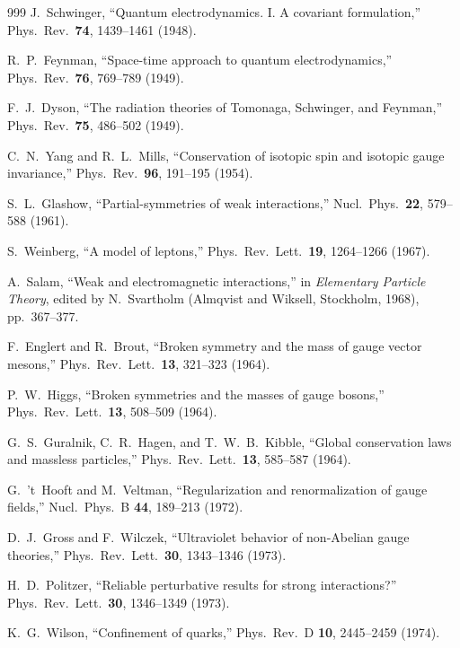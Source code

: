 \documentclass[11pt,a4paper,twoside]{book}
\theoremstyle{definition}
\begin{document}
\begin{thebibliography}{999}
J.~Schwinger,
``Quantum electrodynamics. I. A covariant formulation,''
Phys.\ Rev.\ \textbf{74}, 1439--1461 (1948).

R.~P.~Feynman,
``Space-time approach to quantum electrodynamics,''
Phys.\ Rev.\ \textbf{76}, 769--789 (1949).

F.~J.~Dyson,
``The radiation theories of Tomonaga, Schwinger, and Feynman,''
Phys.\ Rev.\ \textbf{75}, 486--502 (1949).

C.~N.~Yang and R.~L.~Mills,
``Conservation of isotopic spin and isotopic gauge invariance,''
Phys.\ Rev.\ \textbf{96}, 191--195 (1954).

S.~L.~Glashow,
``Partial-symmetries of weak interactions,''
Nucl.\ Phys.\ \textbf{22}, 579--588 (1961).

S.~Weinberg,
``A model of leptons,'' Phys.\ Rev.\ Lett.\ \textbf{19}, 1264--1266 (1967).

A.~Salam,
``Weak and electromagnetic interactions,'' in
\emph{Elementary Particle Theory}, edited by N.~Svartholm
(Almqvist and Wiksell, Stockholm, 1968), pp.~367--377.

F.~Englert and R.~Brout,
``Broken symmetry and the mass of gauge vector mesons,''
Phys.\ Rev.\ Lett.\ \textbf{13}, 321--323 (1964).

P.~W.~Higgs,
``Broken symmetries and the masses of gauge bosons,''
Phys.\ Rev.\ Lett.\ \textbf{13}, 508--509 (1964).

G.~S.~Guralnik, C.~R.~Hagen, and T.~W.~B.~Kibble,
``Global conservation laws and massless particles,''
Phys.\ Rev.\ Lett.\ \textbf{13}, 585--587 (1964).

G.~'t~Hooft and M.~Veltman,
``Regularization and renormalization of gauge fields,''
Nucl.\ Phys.\ B \textbf{44}, 189--213 (1972).

D.~J.~Gross and F.~Wilczek,
``Ultraviolet behavior of non-Abelian gauge theories,''
Phys.\ Rev.\ Lett.\ \textbf{30}, 1343--1346 (1973).

H.~D.~Politzer,
``Reliable perturbative results for strong interactions?''
Phys.\ Rev.\ Lett.\ \textbf{30}, 1346--1349 (1973).

K.~G.~Wilson,
``Confinement of quarks,'' Phys.\ Rev.\ D \textbf{10}, 2445--2459 (1974).


\end{thebibliography}
\end{document}
